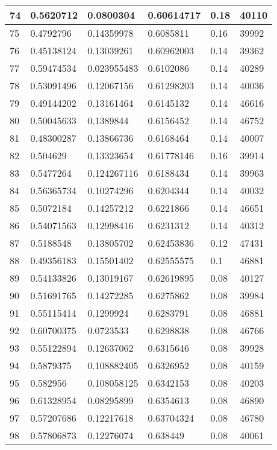 \begin{longtable}{|l|l|l|l|l|l|}
74 & 0.5620712 & 0.0800304 & 0.60614717 & 0.18 & 40110 \\ \hline 
75 & 0.4792796 & 0.14359978 & 0.6085811 & 0.16 & 39992 \\ \hline 
76 & 0.45138124 & 0.13039261 & 0.60962003 & 0.14 & 39362 \\ \hline 
77 & 0.59474534 & 0.023955483 & 0.6102086 & 0.14 & 40289 \\ \hline 
78 & 0.53091496 & 0.12067156 & 0.61298203 & 0.14 & 40036 \\ \hline 
79 & 0.49144202 & 0.13161464 & 0.6145132 & 0.14 & 46616 \\ \hline 
80 & 0.50045633 & 0.1389844 & 0.6156452 & 0.14 & 46752 \\ \hline 
81 & 0.48300287 & 0.13866736 & 0.6168464 & 0.14 & 40007 \\ \hline 
82 & 0.504629 & 0.13323654 & 0.61778146 & 0.16 & 39914 \\ \hline 
83 & 0.5477264 & 0.124267116 & 0.6188434 & 0.14 & 39963 \\ \hline 
84 & 0.56365734 & 0.10274296 & 0.6204344 & 0.14 & 40032 \\ \hline 
85 & 0.5072184 & 0.14257212 & 0.6221866 & 0.14 & 46651 \\ \hline 
86 & 0.54071563 & 0.12998416 & 0.6231312 & 0.14 & 40312 \\ \hline 
87 & 0.5188548 & 0.13805702 & 0.62453836 & 0.12 & 47431 \\ \hline 
88 & 0.49356183 & 0.15501402 & 0.62555575 & 0.1 & 46881 \\ \hline 
89 & 0.54133826 & 0.13019167 & 0.62619895 & 0.08 & 40127 \\ \hline 
90 & 0.51691765 & 0.14272285 & 0.6275862 & 0.08 & 39984 \\ \hline 
91 & 0.55115414 & 0.1299924 & 0.6283791 & 0.08 & 46881 \\ \hline 
92 & 0.60700375 & 0.0723533 & 0.6298838 & 0.08 & 46766 \\ \hline 
93 & 0.55122894 & 0.12637062 & 0.6315646 & 0.08 & 39928 \\ \hline 
94 & 0.5879375 & 0.108882405 & 0.6326952 & 0.08 & 40159 \\ \hline 
95 & 0.582956 & 0.108058125 & 0.6342153 & 0.08 & 40203 \\ \hline 
96 & 0.61328954 & 0.08295899 & 0.6354613 & 0.08 & 46890 \\ \hline 
97 & 0.57207686 & 0.12217618 & 0.63704324 & 0.08 & 46780 \\ \hline 
98 & 0.57806873 & 0.12276074 & 0.638449 & 0.08 & 40061 \\ \hline 

\end{longtable}
